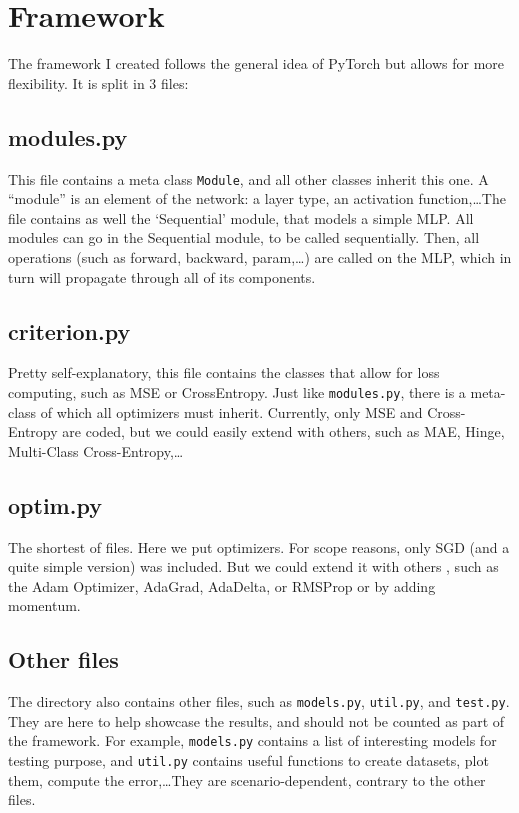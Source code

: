 \documentclass[10pt,conference]{IEEEtran}
\begin{document}
\section{Framework}
The framework I created follows the general idea of PyTorch but allows for more flexibility. It is split in 3 files:
\subsection{modules.py}
This file contains a meta class \texttt{Module}, and all other classes inherit this one. A ``module'' is an element of the network: a layer type, an activation function,\ldots The file contains as well the `Sequential' module, that models a simple MLP. All modules can go in the Sequential module, to be called sequentially. Then, all operations (such as forward, backward, param,\ldots) are called on the MLP, which in turn will propagate through all of its components.
\subsection{criterion.py}
Pretty self-explanatory, this file contains the classes that allow for loss computing, such as MSE or CrossEntropy. Just like \texttt{modules.py}, there is a meta-class of which all optimizers must inherit. Currently, only MSE and Cross-Entropy are coded, but we could easily extend with others, such as MAE, Hinge, Multi-Class Cross-Entropy,\ldots

\subsection{optim.py}
The shortest of files. Here we put optimizers. For scope reasons, only SGD (and a quite simple version) was included. But we could extend it with others \cite{postalcioglu_performance_2019}, such as the Adam Optimizer, AdaGrad, AdaDelta, or RMSProp or by adding momentum.

\subsection{Other files}
The directory also contains other files, such as \texttt{models.py}, \texttt{util.py}, and \texttt{test.py}. They are here to help showcase the results, and should not be counted as part of the framework. For example, \texttt{models.py} contains a list of interesting models for testing purpose, and \texttt{util.py} contains useful functions to create datasets, plot them, compute the error,\ldots They are scenario-dependent, contrary to the other files.
\end{document}
